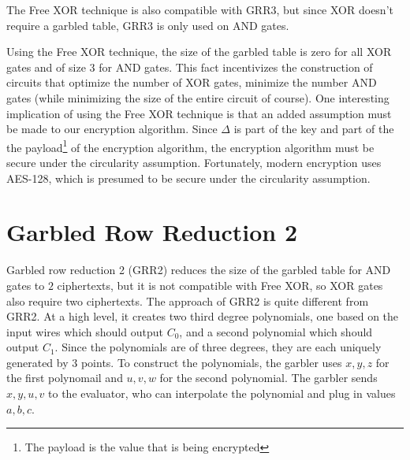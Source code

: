 The Free XOR technique is also compatible with GRR3, but since XOR doesn't require a garbled table, GRR3 is only used on AND gates.

Using the Free XOR technique, the size of the garbled table is zero for all XOR gates and of size $3$ for AND gates.
This fact incentivizes the construction of circuits that optimize the number of XOR gates, minimize the number AND gates (while minimizing the size of the entire circuit of course).
One interesting implication of using the Free XOR technique is that an added assumption must be made to our encryption algorithm.
Since $\Delta$ is part of the key and part of the the payload\footnote{The payload is the value that is being encrypted} of the encryption algorithm, the encryption algorithm must be secure under the circularity assumption.
Fortunately, modern encryption uses AES-128, which is presumed to be secure under the circularity assumption.


\section{Garbled Row Reduction 2}
Garbled row reduction 2 (GRR2) reduces the size of the garbled table for AND gates to $2$ ciphertexts, but it is not compatible with Free XOR, so XOR gates also require two ciphertexts.
The approach of GRR2 is quite different from GRR2. 
At a high level, it creates two third degree polynomials, one based on the input wires which should output $C_0$, and a second polynomial which should output $C_1$.
Since the polynomials are of three degrees, they are each uniquely generated by $3$ points. 
To construct the polynomials, the garbler uses $x,y,z$ for the first polynomail and $u,v,w$ for the second polynomial.
The garbler sends $x,y,u,v$ to the evaluator, who can interpolate the polynomial and plug in values $a,b,c$.

